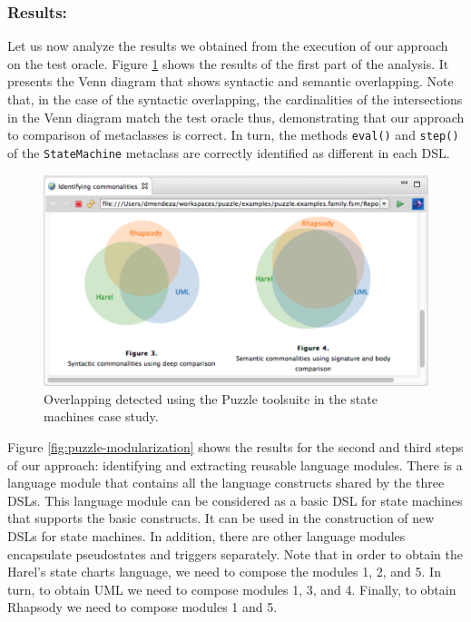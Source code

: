 \vspace{-3mm}
\subsubsection{Results:} Let us now analyze the results we obtained from the execution of our approach on the test oracle. Figure \ref{fig:puzzle-overlapping} shows the results of the first part of the analysis. It presents the Venn diagram that shows syntactic and semantic overlapping. Note that, in the case of the syntactic overlapping, the cardinalities of the intersections in the Venn diagram match the test oracle thus, demonstrating that our approach to comparison of metaclasses is correct. In turn, the methods \texttt{eval()} and \texttt{step()} of the \texttt{StateMachine} metaclass are correctly identified as different in each DSL.

\begin{figure}
\centering
\includegraphics[draft,width=1\linewidth]{images/puzzle-overlapping.pdf}
\caption{Overlapping detected using the Puzzle toolsuite in the state machines case study. }
\label{fig:puzzle-overlapping}
\end{figure}

Figure \ref{fig:puzzle-modularization} shows the results for the second and third steps of our approach: identifying and extracting reusable language modules. There is a language module that contains all the language constructs shared by the three DSLs. This language module can be considered as a basic DSL for state machines that supports the basic constructs. It can be used in the construction of new DSLs for state machines. In addition, there are other language modules encapsulate pseudostates and triggers separately. Note that in order to obtain the Harel's state charts language, we need to compose the modules 1, 2, and 5. In turn, to obtain UML we need to compose modules 1, 3, and 4. Finally, to obtain Rhapsody we need to compose modules 1 and 5.


